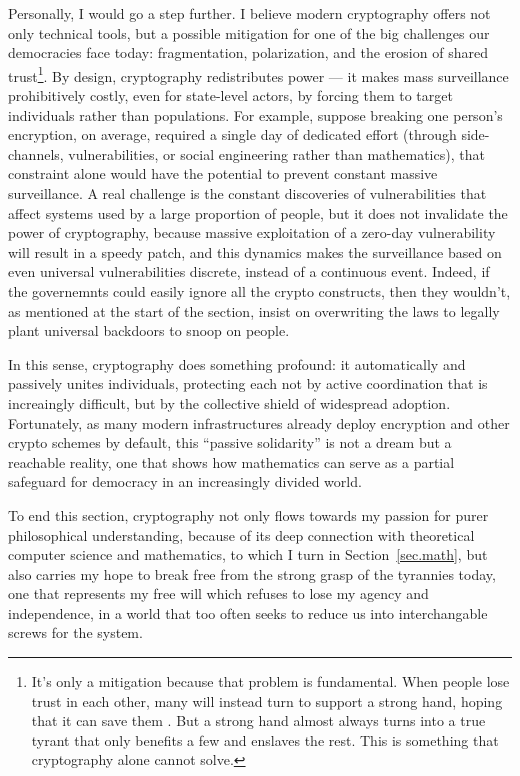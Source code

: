 \documentclass[10pt]{article}
\begin{document}
Personally, I would go a step further. I believe modern cryptography offers not
only technical tools, but a possible mitigation for one of the big
challenges our democracies face today: fragmentation, polarization, and the
erosion of shared trust\footnote{It's only a mitigation because that problem is
	fundamental. When people lose trust in each other, many will instead turn to
	support a strong hand, hoping that it can save them
	\cite{trust.book.fukuyama, how.democracies.die, cultural.backlash}. But a
strong hand almost always turns into a true tyrant that only benefits a few and
enslaves the rest. This is something that cryptography alone cannot solve.}. By
design, cryptography redistributes power --- it makes mass surveillance
prohibitively costly, even for state-level actors, by forcing them to target
individuals rather than populations. For example, suppose breaking one person’s
encryption, on average, required a single day of dedicated effort (through
side-channels, vulnerabilities, or social engineering rather than mathematics),
that constraint alone would have the potential to prevent constant massive
surveillance. A real challenge is the constant discoveries of
vulnerabilities that affect systems used by a large proportion of people, but
it does not invalidate the power of cryptography, because massive exploitation
of a zero-day vulnerability will result in a speedy patch, and this dynamics
makes the surveillance based on even universal vulnerabilities discrete,
instead of a continuous event. Indeed, if the governemnts could easily ignore all
the crypto constructs, then they wouldn't, as mentioned at the start of the
section, insist on overwriting the laws to legally plant universal backdoors to
snoop on people.

In this sense, cryptography does something profound: it automatically and
passively unites individuals, protecting each not by active coordination that
is increaingly difficult, but by the collective shield of widespread adoption.
Fortunately, as many modern infrastructures already deploy encryption and other
crypto schemes by default, this ``passive solidarity'' is not a dream but a
reachable reality, one that shows how mathematics can serve as a partial
safeguard for democracy in an increasingly divided world.

To end this section, cryptography not only flows towards my passion for purer
philosophical understanding, because of its deep connection with theoretical
computer science and mathematics, to which I turn in Section~\ref{sec.math},
but also carries my hope to break free from the strong grasp of the tyrannies
today, one that represents my free will which refuses to lose my agency and
independence, in a world that too often seeks to reduce us into interchangable
screws for the system.  
\end{document}
